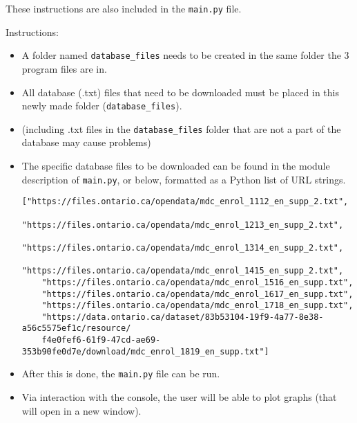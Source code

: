 \documentclass[fontsize=11pt]{article}
\begin{document}
These instructions are also included in the \texttt{main.py} file.

Instructions:
\begin{itemize}
    \item A folder named \texttt{database\_files} needs to be created in the same folder the 3 program files are in.
    \item All database (.txt) files that need to be downloaded must be placed in this newly made folder (\texttt{database\_files}).
    \item (including .txt files in the \texttt{database\_files} folder that are not a part of the database may cause problems)
    \item The specific database files to be downloaded can be found in the module description of \texttt{main.py}, or below, formatted as a Python list of URL strings.

\begin{verbatim}
["https://files.ontario.ca/opendata/mdc_enrol_1112_en_supp_2.txt",
    "https://files.ontario.ca/opendata/mdc_enrol_1213_en_supp_2.txt",
    "https://files.ontario.ca/opendata/mdc_enrol_1314_en_supp_2.txt",
    "https://files.ontario.ca/opendata/mdc_enrol_1415_en_supp_2.txt",
    "https://files.ontario.ca/opendata/mdc_enrol_1516_en_supp.txt",
    "https://files.ontario.ca/opendata/mdc_enrol_1617_en_supp.txt",
    "https://files.ontario.ca/opendata/mdc_enrol_1718_en_supp.txt",
    "https://data.ontario.ca/dataset/83b53104-19f9-4a77-8e38-a56c5575ef1c/resource/
    f4e0fef6-61f9-47cd-ae69-353b90fe0d7e/download/mdc_enrol_1819_en_supp.txt"]
\end{verbatim}

    \item After this is done, the \texttt{main.py} file can be run.
    \item Via interaction with the console, the user will be able to plot graphs (that will open in a new window).

\end{itemize}
\end{document}
